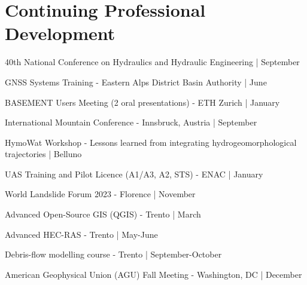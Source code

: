 
\section{Continuing Professional Development}

 40th National Conference on Hydraulics and Hydraulic Engineering | September
\sectionsep

 GNSS Systems Training - Eastern Alps District Basin Authority | June
\sectionsep

 BASEMENT Users Meeting (2 oral presentations) - ETH Zurich | January
\sectionsep

 International Mountain Conference - Innsbruck, Austria | September
\sectionsep

 HymoWat Workshop - Lessons learned from integrating hydrogeomorphological trajectories | Belluno
\sectionsep

\sectionsep

 UAS Training and Pilot Licence (A1/A3, A2, STS) - ENAC | January
\sectionsep

 World Landslide Forum 2023 - Florence | November
\sectionsep

\sectionsep

\sectionsep

 Advanced Open-Source GIS (QGIS) - Trento | March
\sectionsep

\sectionsep

\sectionsep

\sectionsep

 Advanced HEC-RAS - Trento | May-June
\sectionsep

 Debris-flow modelling course - Trento | September-October
\sectionsep

 American Geophysical Union (AGU) Fall Meeting - Washington, DC | December
\sectionsep

